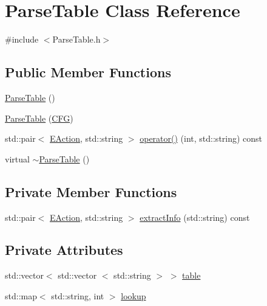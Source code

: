 \hypertarget{classParseTable}{\section{\-Parse\-Table \-Class \-Reference}
\label{d9/da1/classParseTable}
}


{\ttfamily \#include $<$\-Parse\-Table.\-h$>$}

\subsection*{\-Public \-Member \-Functions}
\begin{DoxyCompactItemize}
\item 
\hyperlink{classParseTable_acacf41ffea967138a7eb200a1d03c0bf}{\-Parse\-Table} ()
\item 
\hyperlink{classParseTable_a71107a2b7d2b83142a31d08d9e960fee}{\-Parse\-Table} (\hyperlink{classCFG}{\-C\-F\-G})
\item 
std\-::pair$<$ \hyperlink{ParseTable_8h_a81d4868b129e5f45325894085a36a8a5}{\-E\-Action}, std\-::string $>$ \hyperlink{classParseTable_a276cf2fa3182cff81da31ce69c26a30c}{operator()} (int, std\-::string) const 
\item 
virtual \hyperlink{classParseTable_aa3c8f1c8313c216e39388ec0bd64afc6}{$\sim$\-Parse\-Table} ()
\end{DoxyCompactItemize}
\subsection*{\-Private \-Member \-Functions}
\begin{DoxyCompactItemize}
\item 
std\-::pair$<$ \hyperlink{ParseTable_8h_a81d4868b129e5f45325894085a36a8a5}{\-E\-Action}, std\-::string $>$ \hyperlink{classParseTable_a67d59fa53fbc3136cc8ad6e20c7edf87}{extract\-Info} (std\-::string) const 
\end{DoxyCompactItemize}
\subsection*{\-Private \-Attributes}
\begin{DoxyCompactItemize}
\item 
std\-::vector$<$ std\-::vector\*
$<$ std\-::string $>$ $>$ \hyperlink{classParseTable_a0dbd87ee0d018de6bb990e1ffd8ac26d}{table}
\item 
std\-::map$<$ std\-::string, int $>$ \hyperlink{classParseTable_ac91766c673d5b534e370e31eb71f6604}{lookup}
\end{DoxyCompactItemize}


